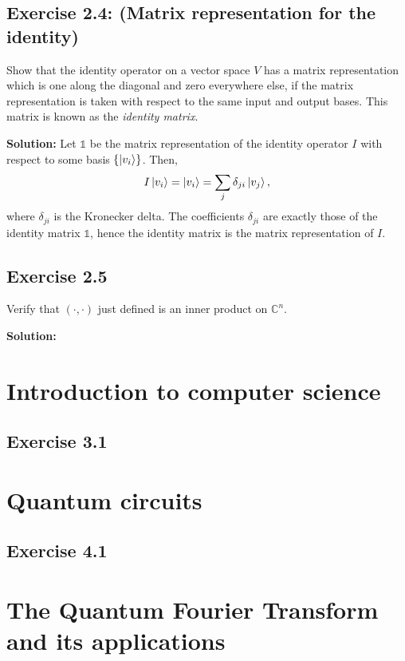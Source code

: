 \documentclass{book}
\begin{document}
\section*{Exercise 2.4: (Matrix representation for the identity)}
    Show that the identity operator on a vector space $V$ has a matrix representation which is one along the diagonal and zero everywhere else, if the matrix representation is taken with respect to the same input and output bases. This matrix is known as the \emph{identity matrix}.
    
    \textbf{Solution:} Let $\mathbb{1}$ be the matrix representation of the identity operator $I$ with respect to some basis $\left\{\ket{v_i}\right\}$. Then,
    \begin{align}
        I\ket{v_i} = \ket{v_i} = \sum_j \delta_{ji}\ket{v_j},
    \end{align}
    where $\delta_{ji}$ is the Kronecker delta. The coefficients $\delta_{ji}$ are exactly those of the identity matrix $\mathbb{1}$, hence the identity matrix is the matrix representation of $I$.
    
\section*{Exercise 2.5}
    Verify that $(\cdot,\cdot)$ just defined is an inner product on $\mathbb{C}^n$.
    
    \textbf{Solution:} 

\chapter{Introduction to computer science}

\section*{Exercise 3.1}

\chapter{Quantum circuits}

\section*{Exercise 4.1}

\chapter{The Quantum Fourier Transform and its applications}
\end{document}
